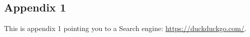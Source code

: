 \documentclass[..main.tex]{subfiles}
\begin{document}
\subsection{Appendix 1}

This is appendix 1 pointing you to a Search engine: \url{https://duckduckgo.com/}.
\end{document}
